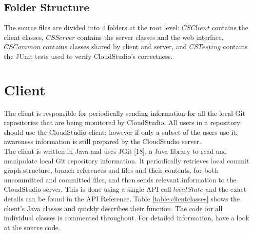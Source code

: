 \subsection{Folder Structure}

The source files are divided into 4 folders at the root level: $CSClient$ contains the client classes, $CSServer$ contains the server classes and the web interface, $CSCommon$ contains classes shared by client and server, and $CSTesting$ contains the JUnit tests used to verify CloudStudio's correctness.






\section{Client}

The client is responsible for periodically sending information for all the local Git repositories that are being monitored by CloudStudio. All users in a repository should use the CloudStudio client; however if only a subset of the users use it, awareness information is still prepared by the CloudStudio server. \\

The client is written in Java and uses JGit [18], a Java library to read and manipulate local Git repository information. It periodically retrieves local commit graph structure, branch references and files and their contents, for both uncommitted and committed files, and then sends relevant information to the CloudStudio server. This is done using a single API call $localState$ and the exact details can be found in the API Reference. Table \ref{table:clientclasses} shows the client's Java classes and quickly describes their function. The code for all individual classes is commented throughout. For detailed information, have a look at the source code. \\




